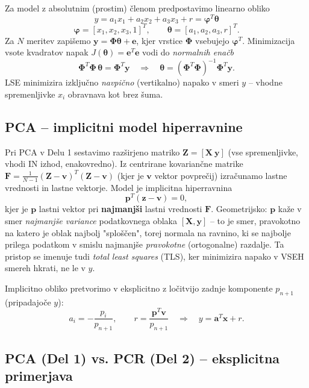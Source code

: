 \documentclass[a4paper, 11pt]{article}
\begin{document}
Za model z absolutnim (prostim) členom predpostavimo linearno obliko
\[
y = a_1 x_1 + a_2 x_2 + a_3 x_3 + r = \boldsymbol{\varphi}^T \boldsymbol{\theta}
\]
\[
\boldsymbol{\varphi} = [x_1, x_2, x_3, 1]^T,\qquad \boldsymbol{\theta} = [a_1,a_2,a_3,r]^T .
\]
Za $N$ meritev zapišemo $\mathbf{y} = \mathbf{\Phi}\boldsymbol{\theta} + \mathbf{e}$, kjer vrstice
$\mathbf{\Phi}$ vsebujejo $\boldsymbol{\varphi}^T$. Minimizacija vsote kvadratov napak
$J(\boldsymbol{\theta}) = \mathbf{e}^T\mathbf{e}$ vodi do \emph{normalnih enačb}
\[
\mathbf{\Phi}^T\mathbf{\Phi}\,\boldsymbol{\theta} = \mathbf{\Phi}^T\mathbf{y}
\quad\Longrightarrow\quad
\boldsymbol{\theta} = (\mathbf{\Phi}^T\mathbf{\Phi})^{-1}\mathbf{\Phi}^T\mathbf{y}.
\]
LSE minimizira izključno \emph{navpično} (vertikalno) napako v smeri $y$ -- vhodne
spremenljivke $x_i$ obravnava kot brez šuma.

\subsection{PCA -- implicitni model hiperravnine}

Pri PCA v Delu 1 sestavimo razširjeno matriko $\mathbf{Z} = [\mathbf{X}\ \mathbf{y}]$
(vse spremenljivke, vhodi IN izhod, enakovredno). Iz centrirane kovariančne matrike
$\mathbf{F} = \tfrac{1}{N-1}(\mathbf{Z}-\mathbf{v})^T(\mathbf{Z}-\mathbf{v})$ (kjer je
$\mathbf{v}$ vektor povprečij) izračunamo lastne vrednosti in lastne vektorje. Model je
implicitna hiperravnina
\[
\mathbf{p}^T(\mathbf{z} - \mathbf{v}) = 0,
\]
kjer je $\mathbf{p}$ lastni vektor pri \textbf{najmanjši} lastni vrednosti $\mathbf{F}$.
Geometrijsko: $\mathbf{p}$ kaže v smer \emph{najmanjše variance} podatkovnega oblaka
$[\mathbf{X},\mathbf{y}]$ -- to je smer, pravokotno na katero je oblak najbolj "sploščen",
torej normala na ravnino, ki se najbolje prilega podatkom v smislu najmanjše
\emph{pravokotne} (ortogonalne) razdalje. Ta pristop se imenuje tudi
\emph{total least squares} (TLS), ker minimizira napako v VSEH smereh hkrati, ne le v $y$.

Implicitno obliko pretvorimo v eksplicitno z ločitvijo zadnje komponente $p_{n+1}$
(pripadajoče $y$):
\[
a_i = -\frac{p_i}{p_{n+1}},\qquad r = \frac{\mathbf{p}^T\mathbf{v}}{p_{n+1}}
\quad\Longrightarrow\quad y = \mathbf{a}^T\mathbf{x} + r .
\]

\subsection{PCA (Del 1) vs. PCR (Del 2) -- eksplicitna primerjava}
\label{sec:pca-vs-pcr}
\end{document}

